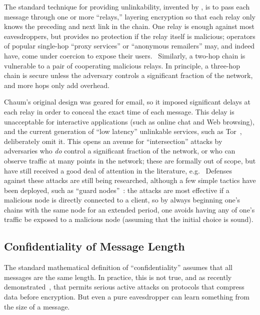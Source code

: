 \documentclass[oneside,tinymargin]{zarticle}
\begin{document}
\begin{multicols}{2}
The standard technique for providing unlinkability, invented by
\textcite{chaum1981mix}, is to pass each message through one or more
“relays,” layering encryption so that each relay only knows the
preceding and next link in the chain. One relay is enough against most
eavesdroppers, but provides no protection if the relay itself is
malicious; operators of popular single-hop “proxy services” or
“anonymous remailers” may, and indeed have, come under coercion to
expose their users.~\cite{newman1996church, singel2007hushmail,
  ackerman2013lavabit} Similarly, a two-hop chain is vulnerable to a
pair of cooperating malicious relays.  In principle, a three-hop chain
is secure unless the adversary controls a significant fraction of the
network, and more hops only add overhead.~\cite{wright2002analysis,
  wright2003defending}

Chaum's original design was geared for email, so it imposed
significant delays at each relay in order to conceal the exact time of
each message.  This delay is unacceptable for interactive applications
(such as online chat and Web browsing), and the current generation of
“low latency” unlinkable services, such as
Tor~\cite{dingledine2004tor}, deliberately omit it.  This opens an
avenue for “intersection” attacks by adversaries who \emph{do} control
a significant fraction of the network, or who can observe traffic at
many points in the network; these are formally out of scope, but have
still received a good deal of attention in the literature,
e.g.~\cite{danezis2003statistical, danezis2004continuous,
  danezis2005statistical, danezis2007twosided, murdoch2007sampled,
  shmatikov2006timing, overlier2006locating} Defenses against these
attacks are still being researched, although a few simple tactics have
been deployed, such as “guard nodes”~\cite{overlier2006locating}: the
attacks are most effective if a malicious node is directly connected
to a client, so by always beginning one's chains with the same node
for an extended period, one avoids having any of one's traffic be
exposed to a malicious node (assuming that the initial choice is
sound).

\subsection{Confidentiality of Message Length}

The standard mathematical definition of “confidentiality” assumes that
all messages are the same length.  In practice, this is not true, and
as recently demonstrated~\cite{duong2012crime,gluck2013breach}, that
permits serious active attacks on protocols that compress data before
encryption.  But even a pure eavesdropper can learn something from the
size of a message.


\end{multicols}
\end{document}
